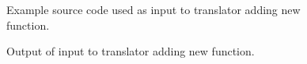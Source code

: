 \begin{figure}[!h]
{\indent
{\mySmallFontSize


\begin{latexonly}
   
\end{latexonly}

\begin{htmlonly}
   
\end{htmlonly}

}
}
\caption{Example source code used as input to translator adding new function.}
\label{Tutorial:exampleInputCode_AddFunctionDeclaration}
\end{figure}

\begin{figure}[!h]
{\indent
{\mySmallFontSize


\begin{latexonly}
   
\end{latexonly}

\begin{htmlonly}
   
\end{htmlonly}

}
}
\caption{Output of input to translator adding new function.}
\label{Tutorial:exampleOutput_AddFunctionDeclaration}
\end{figure}


